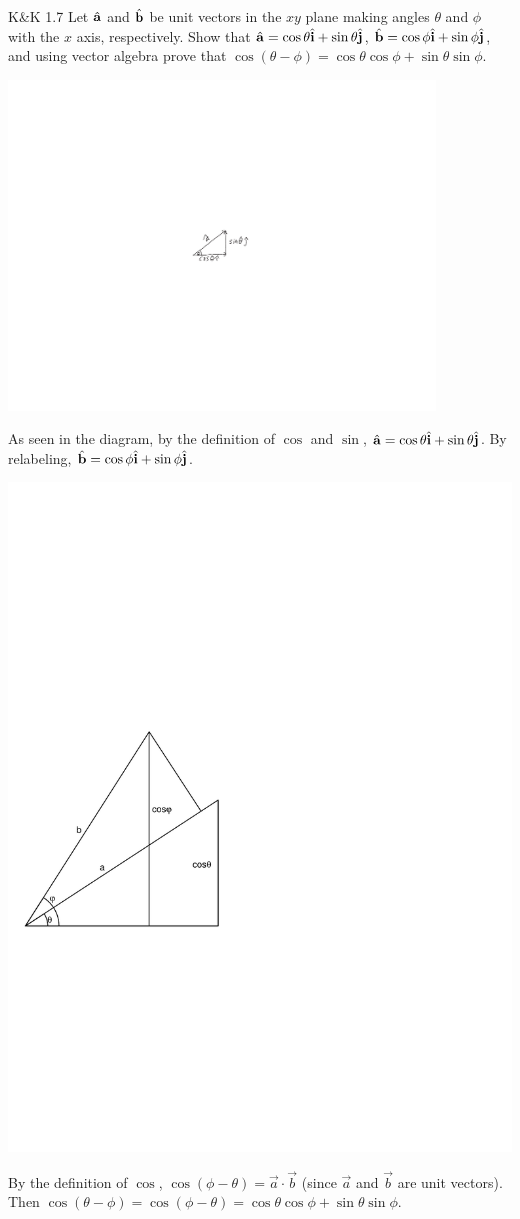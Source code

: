 \documentclass{esg8012pset}
\providecommand{\uvec}[1]{{\hat{\bf{#1}}}}
\begin{document}
\begin{question}[Problem 2]
\begin{problem}{K\&K 1.7}
  Let $\uvec a$ and $\uvec b$ be unit vectors in the $xy$ plane making angles $\theta$ and $\phi$ with the $x$ axis,
  respectively. Show that $\uvec a = \cos\theta\uvec i + \sin\theta\uvec j$, $\uvec b = \cos\phi\uvec i + \sin\phi\uvec j$, and using vector algebra prove
that $\cos(\theta -\phi ) = \cos\theta \cos\phi + \sin\theta \sin\phi$.
\end{problem}
\begin{solution}
  \includegraphics[width=0.85\textwidth]{ps01_Diagram_1}

  As seen in the diagram, by the definition of $\cos$ and $\sin$, $\uvec a = \cos\theta\uvec i + \sin\theta\uvec j$.  By relabeling, $\uvec b = \cos\phi\uvec i + \sin\phi\uvec j$.
  \begin{center}\includegraphics[width=.33\textwidth]{ps01_Diagram_2}\end{center}

  By the definition of $\cos$, $\cos(\phi - \theta) = \vec a \cdot \vec b$ (since $\vec a$ and $\vec b$ are unit vectors).  Then $\cos(\theta - \phi) = \cos(\phi - \theta) = \cos\theta\cos\phi + \sin\theta\sin\phi$.
\end{solution}


\end{question}
\end{document}
